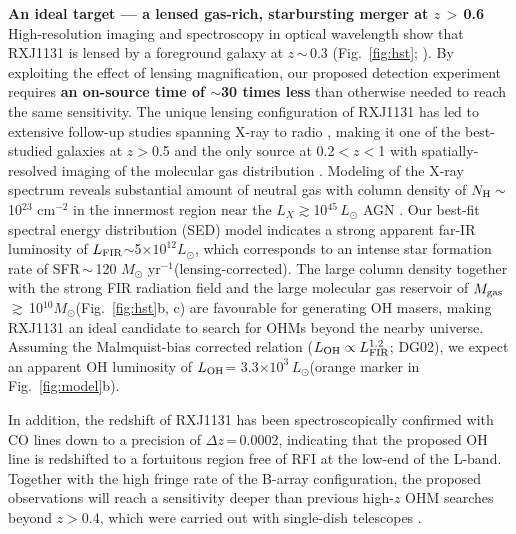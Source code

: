 \documentclass[letterpaper,11pt]{article}
\newcommand{\Lsun}{\mbox{$L_{\odot}$}\xspace}
\newcommand{\Msun}{\mbox{$M_{\odot}$}\xspace}
\newcommand{\LFIR}{\mbox{$L_{\rm FIR}$}\xspace}
\newcommand{\LOH}{$L_{\rm OH}$\xspace}
\newcommand{\pmOne}{\mbox{$^{-1}$}\xspace}
\newcommand{\Fig}[1]{Fig.~\ref{fig:#1}}
\newcommand{\E}[1]{\mbox{$\times10^{#1}$}}
\newcommand{\eq}{\,=\,}
\newcommand{\ssim}{\,$\sim$\,}
\newcommand{\obs}{observations\xspace}
\begin{document}
\noindent \textbf{An ideal target --- a lensed gas-rich, starbursting merger at $z$\,$>$\,0.6}\\
\noindent High-resolution imaging and spectroscopy in optical wavelength show that RXJ1131 is
lensed by a foreground galaxy at $z$\ssim0.3 (\Fig{hst}; \citealt{Sluse03a}).
By exploiting the effect of lensing magnification,
our proposed detection experiment requires {\bf an on-source time of  %
$\sim$30 times less} than otherwise needed to reach the same sensitivity.
The unique lensing configuration of RXJ1131 has led to extensive follow-up studies spanning X-ray to radio \citep[\Fig{hst}e; e.g.,][]{Claeskens06a, Sluse07a, Leung17a},
making it one of the best-studied galaxies at $z$$>$0.5 and
the only source at 0.2$<$$z$$<$1 with spatially-resolved imaging of the molecular gas distribution \citep{Leung17a}.
Modeling of the X-ray spectrum reveals substantial amount of neutral gas with column density of
$N_{\rm H}\sim$10$^{23}$ cm$^{-2}$ in the innermost region near %
the $L_X$$\gtrsim$10$^{45}$\,\Lsun AGN \citep{Pooley07a, Reis14a}.
Our best-fit spectral energy distribution (SED) model indicates
a strong apparent far-IR luminosity of \LFIR$\sim$5\E{12}\Lsun, which corresponds to
an intense star formation rate of SFR\ssim120 \Msun yr\pmOne (lensing-corrected).
The large column density together with the strong FIR radiation field %
and the large molecular gas reservoir of $M_{\rm gas}$\,$\gtrsim$\,10$^{10}$\Msun (\Fig{hst}b, c)
are favourable for generating OH masers, making RXJ1131 an ideal candidate
to search for OHMs beyond the nearby universe. Assuming the Malmquist-bias corrected relation
($L_{\rm OH}\propto L_{\rm FIR}^{1.2}$; DG02), we expect an apparent OH luminosity of \LOH= 3.3\E{3}\,\Lsun (orange marker in \Fig{model}b).

\noindent In addition, the redshift of RXJ1131 has been spectroscopically confirmed with CO lines down to a precision of
$\Delta z$\eq0.0002, indicating that the proposed OH line is redshifted to a fortuitous region
free of RFI at the low-end of the L-band.
Together with the high fringe rate of the B-array configuration, the proposed \obs will
reach a sensitivity deeper than previous high-$z$ OHM searches beyond $z$$>$0.4, which were carried out
with single-dish telescopes \citep[\Fig{model}b; e.g.][]{Darling02a, Willett12a}.
\end{document}
